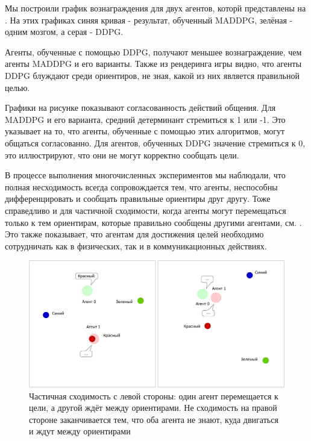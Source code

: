 Мы построили график вознаграждения для двух агентов, которй представлены на . На этих графиках синяя кривая - результат, обученный MADDPG, зелёная - одним мозгом, а серая - DDPG.

Агенты, обученные с помощью DDPG, получают меньшее вознаграждение, чем агенты MADDPG и его варианты. Также из рендеринга игры видно, что агенты DDPG блуждают среди ориентиров, не зная, какой из них является правильной целью.

Графики на рисунке  показывают согласованность действий общения. Для MADDPG и его варианта, средний детерминант стремиться к 1 или -1. Это указывает на то, что агенты, обученные с помощью этих алгоритмов, могут общаться согласованно. Для агентов, обученных DDPG значение стремиться к 0, это иллюстрируют, что они не могут корректно сообщать цели.

В процессе выполнения многочисленных экспериментов мы наблюдали, что полная несходимость всегда сопровождается тем, что агенты, неспособны дифференцировать и сообщать правильные ориентиры друг другу. Тоже справедливо и для частичной сходимости, когда агенты могут перемещаться только к тем ориентирам, которые правильно сообщены другими агентами, см. . Это также показывает, что агентам для достижения целей необходимо сотрудничать как в физических, так и в коммуникационных действиях.

\begin{figure}[ht!]
	\center
	\includegraphics [scale=0.45] {my_folder/images/ch5/results-sr-non-convergency.png}
	\caption{Частичная сходимость с левой стороны: один агент перемещается к цели, а другой ждёт между ориентирами. Не сходимость на правой стороне заканчивается тем, что оба агента не знают, куда двигаться и ждут между ориентирами}
	\label{fig:result-sr-non-convergency}
\end{figure}

